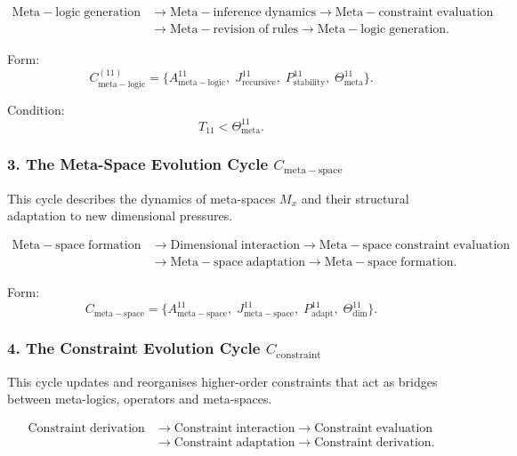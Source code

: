 \[
  \begin{aligned}
  \mathrm{Meta\!-\!logic\;generation}
  &\to \mathrm{Meta\!-\!inference\;dynamics}
  \to \mathrm{Meta\!-\!constraint\;evaluation}\\
  &\to \mathrm{Meta\!-\!revision\;of\;rules}
  \to \mathrm{Meta\!-\!logic\;generation}.
  \end{aligned}
\]

Form:
\[
  C_{\mathrm{meta\!-\!logic}}^{(11)}
  =
  \{
    A^{11}_{\mathrm{meta\!-\!logic}},\;
    J^{11}_{\mathrm{recursive}},\;
    P^{11}_{\mathrm{stability}},\;
    \Theta^{11}_{\mathrm{meta}}
  \}.
\]

Condition:
\[
  T_{11}<\Theta^{11}_{\mathrm{meta}}.
\]


\subsubsection{3. The Meta-Space Evolution Cycle $C_{\mathrm{meta\!-\!space}}$}

This cycle describes the dynamics of meta-spaces $M_x$ and their structural
adaptation to new dimensional pressures.

\[
  \begin{aligned}
  \mathrm{Meta\!-\!space\;formation}
  &\to \mathrm{Dimensional\;interaction}
  \to \mathrm{Meta\!-\!space\;constraint\;evaluation}\\
  &\to \mathrm{Meta\!-\!space\;adaptation}
  \to \mathrm{Meta\!-\!space\;formation}.
  \end{aligned}
\]

Form:
\[
  C_{\mathrm{meta\!-\!space}}
  =
  \{
    A^{11}_{\mathrm{meta\!-\!space}},\;
    J^{11}_{\mathrm{meta\!-\!space}},\;
    P^{11}_{\mathrm{adapt}},\;
    \Theta^{11}_{\mathrm{dim}}
  \}.
\]


\subsubsection{4. The Constraint Evolution Cycle $C_{\mathrm{constraint}}$}

This cycle updates and reorganises higher-order constraints that act as
bridges between meta-logics, operators and meta-spaces.

\[
  \begin{aligned}
  \mathrm{Constraint\;derivation}
  &\to \mathrm{Constraint\;interaction}
  \to \mathrm{Constraint\;evaluation}\\
  &\to \mathrm{Constraint\;adaptation}
  \to \mathrm{Constraint\;derivation}.
  \end{aligned}
\]


